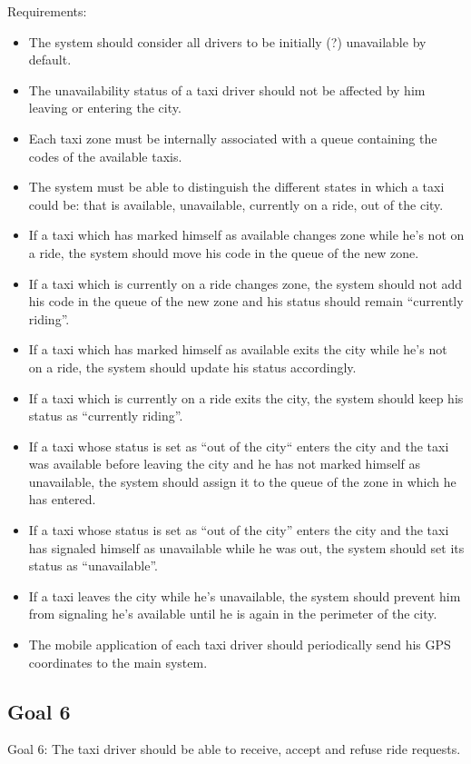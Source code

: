 Requirements:
\begin{itemize}
\item The system should consider all drivers to be initially (?) unavailable by default.
\item The unavailability status of a taxi driver should not be affected by him leaving or entering the city.
\item Each taxi zone must be internally associated with a queue containing the codes of the available taxis.
\item The system must be able to distinguish the different states in which a taxi could be: that is available, unavailable, currently on a ride, out of the city.
\item If a taxi which has marked himself as available changes zone while he’s not on a ride, the system should move his code in the queue of the new zone. 
\item If a taxi which is currently on a ride changes zone, the system should not add his code in the queue of the new zone and his status should remain “currently riding”.
\item If a taxi which has marked himself as available exits the city while he’s not on a ride, the system should update his status accordingly.
\item If a taxi which is currently on a ride exits the city, the system should keep his status as “currently riding”. 
\item If a taxi whose status is set as “out of the city“  enters the city and the taxi was available before leaving the city and he has not marked himself as unavailable, the system should assign it to the queue of the zone in which he has entered.
\item If a taxi whose status is set as “out of the city” enters the city and the taxi has signaled himself as unavailable while he was out, the system should set its status as “unavailable”. 
\item If a taxi leaves the city while he’s unavailable, the system should prevent him from signaling he’s available until he is again in the perimeter of the city.
\item The mobile application of each taxi driver should periodically send his GPS coordinates to the main system. 
\end{itemize}

\subsection{Goal 6}
Goal 6: The taxi driver should be able to receive, accept and refuse ride requests.

